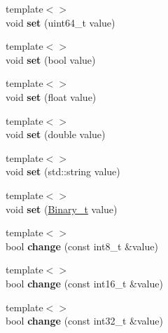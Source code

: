 \begin{DoxyCompactItemize}
{\footnotesize template$<$$>$ }\\void {\bfseries set} (uint64\+\_\+t value)
\item 
\mbox{\label{classsf_1_1Data_a188831bcb2e11cde98ed387665a1f45f}} 
{\footnotesize template$<$$>$ }\\void {\bfseries set} (bool value)
\item 
\mbox{\label{classsf_1_1Data_a7a499c96dba075521bed830d760198af}} 
{\footnotesize template$<$$>$ }\\void {\bfseries set} (float value)
\item 
\mbox{\label{classsf_1_1Data_a2e0195a4209d8b9642f4f2e17722104b}} 
{\footnotesize template$<$$>$ }\\void {\bfseries set} (double value)
\item 
\mbox{\label{classsf_1_1Data_a99022ecec3218c81bb74f24d1b3a1bbd}} 
{\footnotesize template$<$$>$ }\\void {\bfseries set} (std\+::string value)
\item 
\mbox{\label{classsf_1_1Data_a9ae956ea74c16664d0a0e5d2366bbb0b}} 
{\footnotesize template$<$$>$ }\\void {\bfseries set} (\hyperlink{namespacesf_a3cfcc379b8afaf098c4e1aa67ef92186}{Binary\+\_\+t} value)
\item 
\mbox{\label{classsf_1_1Data_a4dc68aad54c61a8e3625f4ede262ccb3}} 
{\footnotesize template$<$$>$ }\\bool {\bfseries change} (const int8\+\_\+t \&value)
\item 
\mbox{\label{classsf_1_1Data_ab3d3436ada0f0f538c1ccec8c69f20d2}} 
{\footnotesize template$<$$>$ }\\bool {\bfseries change} (const int16\+\_\+t \&value)
\item 
\mbox{\label{classsf_1_1Data_a971aa7ec9562f7148a5f0575184fc412}} 
{\footnotesize template$<$$>$ }\\bool {\bfseries change} (const int32\+\_\+t \&value)
\item 
\mbox{\label{classsf_1_1Data_a0e9b414634fdf3a20b2339a0d6db33f0}} 

\end{DoxyCompactItemize}
